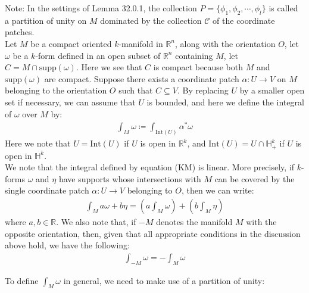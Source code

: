 \documentclass[15pt]{book}
\theoremstyle{break}
\theoremstyle{break}
\newcommand{\R}{\mathbb{R}}
\newcommand{\C}{\mathcal{C}}
\newcommand{\note}{\color{red}Note: \color{black}}
\begin{document}
\note In the settings of Lemma 32.0.1, the collection $P = \{ \phi_1, \phi_2,\cdots, \phi_l\}$ is called a partition of unity on $M$ dominated by the collection $\C$ of the coordinate patches.\\

Let $M$ be a compact oriented $k$-manifold in $\R^n$, along with the orientation $O$, let $\omega$ be a $k$-form defined in an open subset of $\R^n$ containing $M$, let $C = M \cap \text{supp}(\omega)$. Here we see that $C$ is compact because both $M$ and $\text{supp}(\omega)$ are compact. Suppose there exists a coordinate patch $\alpha:U \to V$ on $M$ belonging to the orientation $O$ such that $C \subseteq V$. By replacing $U$ by a smaller open set if necessary, we can assume that $U$ is bounded, and here we define the integral of $\omega$ over $M$ by:
\begin{align*}
\int_M \omega \coloneqq \int_{\text{Int}(U)}\alpha^*\omega \tag{KM}
\end{align*}
Here we note that $U = \text{Int}(U)$ if $U$ is open in $\R^k$, and $\text{Int}(U) = U \cap \mathbb{H}_+^k$ if $U$ is open in $\mathbb{H}^k$.\\

We note that the integral defined by equation (KM) is linear. More precisely, if $k$-forms $\omega$ and $\eta$ have supports whose intersections with $M$ can be covered by the single coordinate patch $\alpha:U \to V$ belonging to $O$, then we can write:
\begin{align*}
\int_M a\omega+ b \eta =\left( a \int_M \omega\right) + \left(b \int_M \eta\right)
\end{align*}
where $a,b \in \R$. We also note that, if $-M$ denotes the manifold $M$ with the opposite orientation, then, given that all appropriate conditions in the discussion above hold, we have the following:
\begin{align*}
\int_{-M}\omega  = -\int_M \omega
\end{align*}

To define $\int_M \omega$ in general, we need to make use of a partition of unity:
\end{document}
